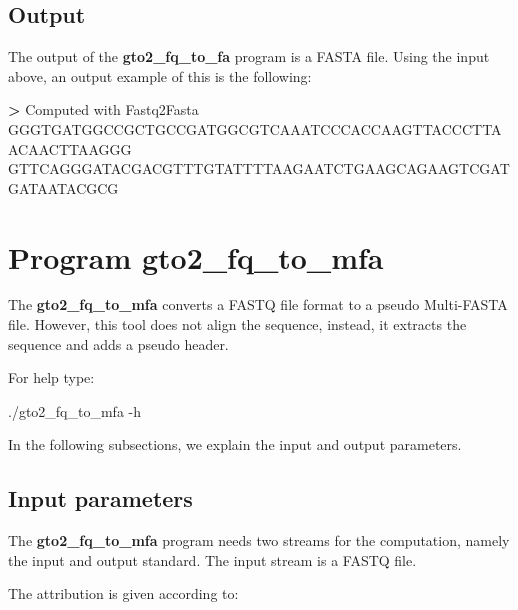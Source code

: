 \documentclass[11pt,]{krantz}
\newenvironment{Shaded}{\begin{snugshade}}{\end{snugshade}}
\newcommand{\OperatorTok}[1]{\textcolor[rgb]{0.43,0.43,0.43}{\textbf{#1}}}
\newcommand{\ExtensionTok}[1]{#1}
\newcommand{\NormalTok}[1]{#1}
\begin{document}
\subsection*{Output}\label{output}


The output of the \textbf{gto2\_fq\_to\_fa} program is a FASTA file.
Using the input above, an output example of this is the following:

\begin{Shaded}
\begin{Highlighting}[]
\OperatorTok{>} \ExtensionTok{Computed}\NormalTok{ with Fastq2Fasta}
\ExtensionTok{GGGTGATGGCCGCTGCCGATGGCGTCAAATCCCACCAAGTTACCCTTAACAACTTAAGGG}
\ExtensionTok{GTTCAGGGATACGACGTTTGTATTTTAAGAATCTGAAGCAGAAGTCGATGATAATACGCG}
\end{Highlighting}
\end{Shaded}

\section{Program gto2\_fq\_to\_mfa}\label{program-gto2_fq_to_mfa}

The \textbf{gto2\_fq\_to\_mfa} converts a FASTQ file format to a pseudo
Multi-FASTA file. However, this tool does not align the sequence,
instead, it extracts the sequence and adds a pseudo header.

For help type:

\begin{Shaded}
\begin{Highlighting}[]
\ExtensionTok{./gto2_fq_to_mfa}\NormalTok{ -h}
\end{Highlighting}
\end{Shaded}

In the following subsections, we explain the input and output
parameters.

\subsection*{Input parameters}\label{input-parameters-1}


The \textbf{gto2\_fq\_to\_mfa} program needs two streams for the
computation, namely the input and output standard. The input stream is a
FASTQ file.

The attribution is given according to:
\end{document}
